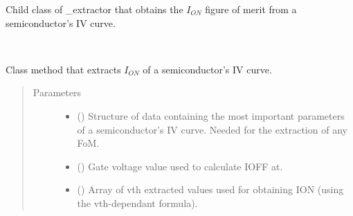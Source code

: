 \documentclass[letterpaper,10pt,english,openany, oneside]{sphinxmanual}
\begin{document}
\begin{fulllineitems}
\label{\detokenize{index:fompy.fom.ion_ext}}
Child class of \_extractor that obtains the \(I_{ON}\) figure of merit from a semiconductor’s IV curve.

\begin{fulllineitems}
\label{\detokenize{index:fompy.fom.ion_ext.extraction}}~

\begin{fulllineitems}
Class method that extracts \(I_{ON}\) of a semiconductor’s IV curve.

\end{fulllineitems}

\begin{quote}\begin{description}
\item[{Parameters}] \leavevmode\begin{itemize}
\item {} 
 () \textendash{} Structure of data containing the most important parameters of a semiconductor’s IV curve.
Needed for the extraction of any FoM.

\item {} 
 () \textendash{} Gate voltage value used to calculate IOFF at.

\item {} 
 () \textendash{} Array of vth extracted values used for obtaining ION (using the vth-dependant formula).

\end{itemize}

\end{description}\end{quote}

\end{fulllineitems}


\end{fulllineitems}
\end{document}
